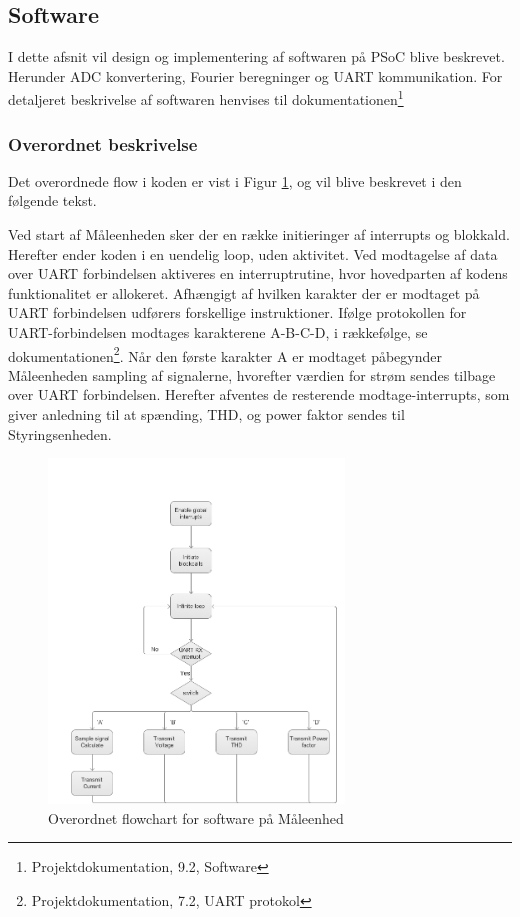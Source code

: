 
\subsection{Software}
I dette afsnit vil design og implementering af softwaren på PSoC blive beskrevet. Herunder ADC konvertering, Fourier beregninger og  UART kommunikation. For detaljeret beskrivelse af softwaren henvises til dokumentationen\footnote{Projektdokumentation, 9.2, Software}

\subsubsection{Overordnet beskrivelse}
Det overordnede flow i koden er vist i Figur \ref{fig:MEflowchart}, og vil blive beskrevet i den følgende tekst.  

Ved start af Måleenheden sker der en række initieringer af interrupts og blokkald. Herefter ender koden i en uendelig loop, uden aktivitet. Ved modtagelse af data over UART forbindelsen aktiveres en interruptrutine, hvor hovedparten af kodens funktionalitet er allokeret. 
Afhængigt af hvilken karakter der er modtaget på UART forbindelsen udførers forskellige instruktioner. Ifølge protokollen for UART-forbindelsen modtages karakterene A-B-C-D, i rækkefølge, se dokumentationen\footnote{Projektdokumentation, 7.2, UART protokol}.
Når den første karakter A er modtaget påbegynder Måleenheden sampling af signalerne, hvorefter værdien for strøm sendes tilbage over UART forbindelsen. Herefter afventes de resterende modtage-interrupts, som giver anledning til at spænding, THD, og power faktor sendes til Styringsenheden. 
\begin{figure}[H] %
	\centering
	\includegraphics[width=0.7\textwidth]{Figure/MEflowchart.png}
	\caption{Overordnet flowchart for software på Måleenhed}
	\label{fig:MEflowchart}
\end{figure}




